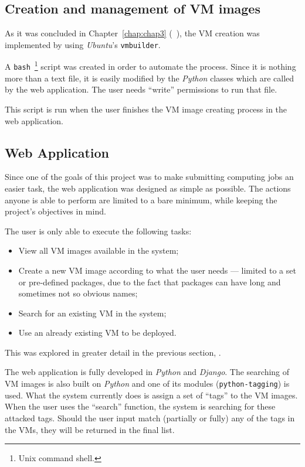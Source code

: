 \subsection{Creation and management of VM images}\label{subsec:vm-create-manage}

As it was concluded in Chapter~\ref{chap:chap3} (~), the VM creation was implemented by using \textit{Ubuntu}'s \texttt{vmbuilder}. 

A \texttt{bash}~\footnote{Unix command shell.} script was created in order to automate the process. Since it is nothing more than a text file, it is easily modified by the \textit{Python} classes which are called by the web application. The user needs ``write'' permissions to run that file.

This script is run when the user finishes the VM image creating process in the web application.

\subsection{Web Application}\label{subsec:webapp}

Since one of the goals of this project was to make submitting computing jobs an easier task, the web application was designed as simple as possible. The actions anyone is able to perform are limited to a bare minimum, while keeping the project's objectives in mind.

The user is only able to execute the following tasks:

\begin{itemize}
\item View all VM images available in the system;
\item Create a new VM image according to what the user needs --- limited to a set or pre-defined packages, due to the fact that packages can have long and sometimes not so obvious names;
\item Search for an existing VM in the system;
\item Use an already existing VM to be deployed.
\end{itemize}

This was explored in greater detail in the previous section, .


The web application is fully developed in \textit{Python} and \textit{Django}. The searching of VM images is also built on \textit{Python} and one of its modules (\texttt{python-tagging}) is used. What the system currently does is assign a set of ``tags'' to the VM images. When the user uses the ``search'' function, the system is searching for these attacked tags. Should the user input match (partially or fully) any of the tags in the VMs, they will be returned in the final list.

